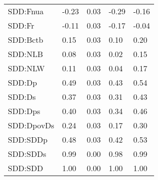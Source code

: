 \begin{center}
\begin{longtable}{|p{0.9in}|p{0.7in}|p{0.7in}|p{0.7in}|p{0.7in}|}
  SDD:Fnua & -0.23 & 0.03 & -0.29 & -0.16 \\ 
  SDD:Fr & -0.11 & 0.03 & -0.17 & -0.04 \\ 
  SDD:Bctb & 0.15 & 0.03 & 0.10 & 0.20 \\ 
  SDD:NLB & 0.08 & 0.03 & 0.02 & 0.15 \\ 
  SDD:NLW & 0.11 & 0.03 & 0.04 & 0.17 \\ 
  SDD:Dp & 0.49 & 0.03 & 0.43 & 0.54 \\ 
  SDD:Ds & 0.37 & 0.03 & 0.31 & 0.43 \\ 
  SDD:Dps & 0.40 & 0.03 & 0.34 & 0.46 \\ 
  SDD:DpovDs & 0.24 & 0.03 & 0.17 & 0.30 \\ 
  SDD:SDDp & 0.48 & 0.03 & 0.42 & 0.53 \\ 
  SDD:SDDs & 0.99 & 0.00 & 0.98 & 0.99 \\ 
  SDD:SDD & 1.00 & 0.00 & 1.00 & 1.00 \\ 
   \hline
\end{longtable}
\end{center}
%

